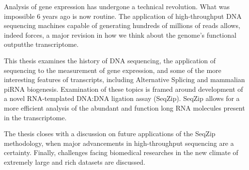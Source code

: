 \label{hd:abstract}
\abstract{} 

Analysis of gene expression has undergone a technical revolution. What was impossible 6 years ago is now routine. The application of high-throughput DNA sequencing machines capable of generating hundreds of millions of reads allows, indeed forces, a major revision in how we think about the genome's functional output\textendash the transcriptome.

\indent This thesis examines the history of DNA sequencing, the application of sequencing to the measurement of gene expression, and some of the more interesting features of transcripts, including Alternative Splicing and mammalian piRNA biogenesis. Examination of these topics is framed around development of a novel RNA-templated DNA:DNA ligation assay (SeqZip). SeqZip allows for a more efficient analysis of the abundant and function long RNA molecules present in the transcriptome.

\indent The thesis closes with a discussion on future applications of the SeqZip methodology, when major advancements in high-throughput sequencing are a certainty. Finally, challenges facing biomedical researches in the new climate of extremely large and rich datasets are discussed.

\setcounter{page}{3}
\clearpage %